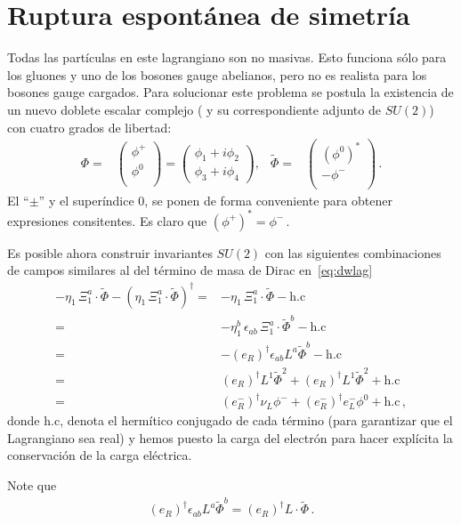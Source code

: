 \section{Ruptura espontánea de simetría}
\label{sec:rupt-espont-de}

\begin{frame}
Todas las partículas en este lagrangiano son no masivas. Esto funciona sólo para los gluones y uno de los bosones gauge abelianos, pero no es realista para los bosones gauge cargados. 
Para solucionar este problema se postula la existencia de un nuevo doblete escalar complejo
( y su correspondiente adjunto de $SU(2)$) con cuatro grados de libertad:
\begin{align}
\label{eq:Phi}
  \Phi=&
  \begin{pmatrix}
    \phi^+\\
    \phi^0\\
  \end{pmatrix}=
  \begin{pmatrix}
    \phi_1+i\phi_2\\
\phi_3+i\phi_4
  \end{pmatrix},&
\widetilde{\Phi}=&
  \begin{pmatrix}
    \left( \phi^0 \right)^{*}\\
   -\phi^-\\
  \end{pmatrix}\,.
\end{align}
El  ``$\pm$'' y el superíndice 0, se ponen de forma conveniente para obtener expresiones consitentes. Es claro que $\left( \phi^+ \right)^{*}=\phi^-\,.$





Es posible ahora construir invariantes $SU(2)$ con las siguientes combinaciones de campos similares al del término de masa de Dirac en~\eqref{eq:dwlag}
\begin{align}
 -\eta_1\,\Xi_1^{a}\cdot\widetilde{\Phi}-\left(\eta_1\,\Xi_1^{a}\cdot\widetilde{\Phi}  \right)^{\dagger}
 =& -\eta_1\,\Xi_1^{a}\cdot\widetilde{\Phi}-\text{h.c}\nonumber\\
 =& -\eta^{b}_1\,\epsilon_{ab}\,\Xi_1^{a}\cdot\widetilde{\Phi}^{b}-\text{h.c} \nonumber\\
   =&-\left( e_R \right)^{\dagger}\epsilon_{ab}L^a\widetilde{\Phi}^b -\text{h.c} \nonumber\\
   =&\left( e_R \right)^{\dagger}L^1\widetilde{\Phi}^2+\left( e_R \right)^{\dagger}L^1\widetilde{\Phi}^2 +\text{h.c} \nonumber\\
   =&\left( e_R^{-} \right)^{\dagger}\nu_L\phi^- +\left( e_R^{-} \right)^{\dagger}e_L^-\phi^0 +\text{h.c} \,,
 \end{align}
donde $\text{h.c}$, denota el hermítico conjugado de cada término (para garantizar que el Lagrangiano sea real)
y hemos puesto la carga del electrón para hacer explícita la conservación de la carga eléctrica. 

Note que
\begin{align}
  \left( e_R \right)^{\dagger}\epsilon_{ab}L^a\widetilde{\Phi}^b=\left( e_R \right)^{\dagger}L\cdot \widetilde{\Phi}\,.
\end{align}


\end{frame}
